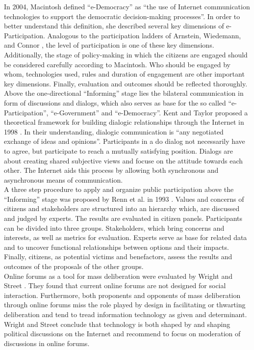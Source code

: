 In 2004, Macintosh \cite{Macintosh2004_eParticipation_characterization} defined ``e-Democracy'' as ``the use of Internet communication technologies to support the democratic decision-making processes''. In order to better understand this definition, she described several key dimensions of e-Participation. Analogous to the participation ladders of Arnstein, Wiedemann, and Connor \cite{Arnstein1969_citizen_participation,Wiedemann1993355,Connor1988_new_ladder}, the level of participation is one of these key dimensions. Additionally, the stage of policy-making in which the citizens are engaged should be considered carefully according to Macintosh. Who should be engaged by whom, technologies used, rules and duration of engagement are other important key dimensions. Finally, evaluation and outcomes should be reflected thoroughly.\\
Above the one-directional ``Informing'' stage lies the bilateral communication in form of discussions and dialogs, which also serves as base for the so called ``e-Participation'', ``e-Government'' and ``e-Democracy''. Kent and Taylor proposed a theoretical framework for building dialogic relationships through the Internet in 1998 \cite{Kent1998_dialogic_relationships_through_www}. In their understanding, dialogic communication is ``any negotiated exchange of ideas and opinions''. Participants in a do dialog not necessarily have to agree, but participate to reach a mutually satisfying position. Dialogs are about creating shared subjective views and focuse on the attitude towards each other. The Internet aids this process by allowing both synchronous and asynchronous means of communication.\\
A three step procedure to apply and organize public participation above the ``Informing'' stage was proposed by Renn et al. in 1993 \cite{Renn1993_participation}. Values and concerns of citizens and stakeholders are structured into an hierarchy which, are discussed and judged by experts. The results are evaluated in citizen panels. Participants can be divided into three groups. Stakeholders, which bring concerns and interests, as well as metrics for evaluation. Experts serve as base for related data and to uncover functional relationships between options and their impacts. Finally, citizens, as potential victims and benefactors, assess the results and outcomes of the proposals of the other groups.\\
Online forums as a tool for mass deliberation were evaluated by Wright and Street \cite{Wright2007_deliberation_design}. They found that current online forums are not designed for social interaction. Furthermore, both proponents and opponents of mass deliberation through online forums miss the role played by design in facilitating or thwarting deliberation and tend to tread information technology as given and determinant. Wright and Street conclude that technology is both shaped by and shaping political discussions on the Internet and recommend to focus on moderation of discussions in online forums.\\
